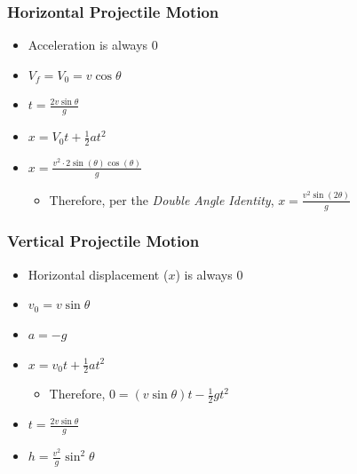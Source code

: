 \documentclass[
  letterpaper,
  DIV=11,
  numbers=noendperiod]{scrartcl}
\providecommand{\tightlist}{%
  \setlength{\itemsep}{0pt}\setlength{\parskip}{0pt}}\usepackage{longtable,booktabs,array}
\begin{document}
\hypertarget{horizontal-projectile-motion}{%
\subsubsection{Horizontal Projectile
Motion}\label{horizontal-projectile-motion}}

\begin{itemize}
\tightlist
\item
  Acceleration is always 0
\item
  \(V_f = V_0 = v\cos{\theta}\)
\item
  \(t = \frac{2v\sin{\theta}}{g}\)
\item
  \(x = V_0t + \frac{1}{2}at^2\)
\item
  \(x = \frac{v^2 \cdot 2\sin({\theta})\cos({\theta})}{g}\)

  \begin{itemize}
  \tightlist
  \item
    Therefore, per the \emph{Double Angle Identity},
    \(x = \frac{v^2\sin({2\theta})}{g}\)
  \end{itemize}
\end{itemize}

\hypertarget{vertical-projectile-motion}{%
\subsubsection{Vertical Projectile
Motion}\label{vertical-projectile-motion}}

\begin{itemize}
\tightlist
\item
  Horizontal displacement (\(x\)) is always 0
\item
  \(v_0 = v\sin{\theta}\)
\item
  \(a = -g\)
\item
  \(x = v_0t + \frac{1}{2}at^2\)

  \begin{itemize}
  \tightlist
  \item
    Therefore, \(0 = (v\sin{\theta})t - \frac{1}{2}gt^2\)
  \end{itemize}
\item
  \(t = \frac{2v\sin{\theta}}{g}\)
\item
  \(h = \frac{v^2}{g}\sin^2{\theta}\)
\end{itemize}
\end{document}
